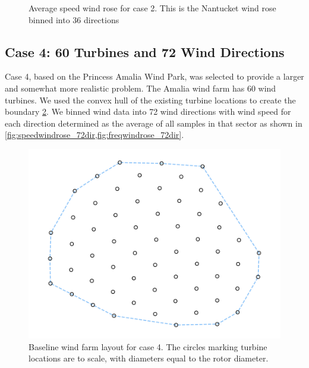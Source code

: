 \documentclass{jpconf}
\begin{document}
\begin{figure}[h!]
\begin{minipage}[t]{18pc}
		\caption{Average speed wind rose for case 2. This is the Nantucket wind rose binned into 36 directions \cite{wrcc2017}}
		\label{fig:speedwindrose_36dir}
	\end{minipage}
\end{figure}

\subsection{Case 4: 60 Turbines and 72 Wind Directions}
Case 4, based on the Princess Amalia Wind Park, was selected to provide a larger and somewhat more realistic problem. The Amalia wind farm has 60 wind turbines. We used the convex hull of the existing turbine locations to create the boundary \cref{fig:layout4}. We binned wind data into 72 wind directions with wind speed for each direction determined as the average of all samples in that sector as shown in \cref{fig:speedwindrose_72dir,fig:freqwindrose_72dir}.
\begin{figure}[h!]
	\centering
	\begin{minipage}[t]{18pc}
		\centering
		\includegraphics[width=1.\textwidth, trim={1.0cm, 0cm, 1.0cm, 0cm}, clip]{final_images/layouts/60_turb_start.pdf}
		\caption{Baseline wind farm layout for case 4. The circles marking turbine locations are to scale, with diameters equal to the rotor diameter.}
		\label{fig:layout4}
	\end{minipage}\hspace{1pc}%
\end{figure}
\end{document}
